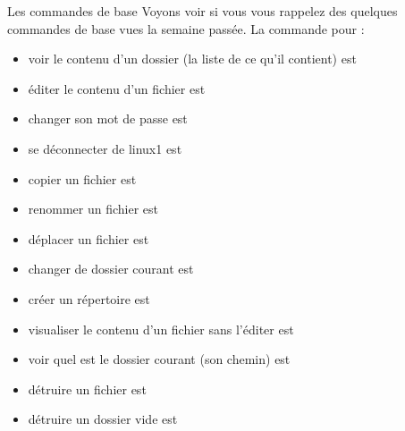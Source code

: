 \documentclass[a4paper,11pt]{article}
\begin{document}
\begin{Exercice}{Les commandes de base}
Voyons voir si vous vous rappelez des quelques commandes de base vues la semaine pass\'ee.
La commande pour :  

\begin{itemize}
	
	\item voir le contenu d'un dossier (la liste de ce qu'il contient) est  \textcolor{gray}{\underline{\hspace*{2em}}} 
	\item \'editer le contenu d'un fichier est  \textcolor{gray}{\underline{\hspace*{3em}}} 
	\item changer son mot de passe est  \textcolor{gray}{\underline{\hspace*{5em}}} 
	\item se d\'econnecter de linux1 est  \textcolor{gray}{\underline{\hspace*{3em}}} 
	\item copier un fichier est  \textcolor{gray}{\underline{\hspace*{2em}}} 
	\item renommer un fichier est  \textcolor{gray}{\underline{\hspace*{2em}}} 
	\item d\'eplacer un fichier est  \textcolor{gray}{\underline{\hspace*{2em}}} 
	\item changer de dossier courant est  \textcolor{gray}{\underline{\hspace*{2em}}} 
	\item cr\'eer un r\'epertoire est  \textcolor{gray}{\underline{\hspace*{3em}}} 
	\item visualiser le contenu d'un fichier sans l'\'editer est  \textcolor{gray}{\underline{\hspace*{2em}}} 
	\item voir quel est le dossier courant (son chemin) est  \textcolor{gray}{\underline{\hspace*{2em}}} 
	\item d\'etruire un fichier est  \textcolor{gray}{\underline{\hspace*{2em}}} 
	\item d\'etruire un dossier vide est  \textcolor{gray}{\underline{\hspace*{3em}}} 
\end{itemize}

\end{Exercice}
\end{document}
